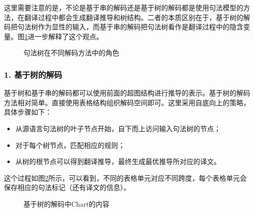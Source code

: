\parinterval 这里需要注意的是，不论是基于串的解码还是基于树的解码都是使用句法模型的方法，在翻译过程中都会生成翻译推导和树结构。二者的本质区别在于，基于树的解码把句法树作为显性的输入，而基于串的解码把句法树看作是翻译过程中的隐含变量。图\ref{fig:8-40}进一步解释了这个观点。

\begin{figure}[htp]
\centering

\setlength{\abovecaptionskip}{-0.5em}
\caption{句法树在不同解码方法中的角色}
\label{fig:8-40}
\end{figure}


\subsubsection{1. 基于树的解码}

\parinterval 基于树和基于串的解码都可以使用前面的超图结构进行推导的表示。基于树的解码方法相对简单。直接使用表格结构组织解码空间即可。这里采用自底向上的策略，具体步骤如下：
\begin{itemize}
\vspace{0.5em}
\item 从源语言句法树的叶子节点开始，自下而上访问输入句法树的节点；
\vspace{0.5em}
\item 对于每个树节点，匹配相应的规则；
\vspace{0.5em}
\item 从树的根节点可以得到翻译推导，最终生成最优推导所对应的译文。
\vspace{0.5em}
\end{itemize}

\parinterval 这个过程如图\ref{fig:8-41}所示，可以看到，不同的表格单元对应不同跨度，每个表格单元会保存相应的句法标记（还有译文的信息）。

\begin{figure}[htp]
\centering

\setlength{\abovecaptionskip}{-0.5em}
\caption{基于树的解码中Chart的内容}
\label{fig:8-41}
\end{figure}

